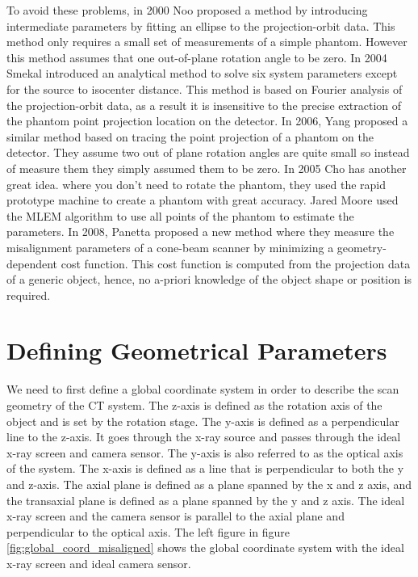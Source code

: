 To avoid these problems, in 2000 Noo \citep{Noo2000} proposed a method by introducing intermediate parameters by fitting an ellipse to the projection-orbit data.  This method only requires a small set of measurements of a simple phantom.  However this method assumes that one out-of-plane rotation angle to be zero.  In 2004 Smekal introduced an analytical method to solve six system parameters except for the source to isocenter distance.  This method is based on Fourier analysis of the projection-orbit data, as a result it is insensitive to the precise extraction of the phantom point projection location on the detector.  In 2006, Yang \citep{Yang2006} proposed a similar method based on tracing the point projection of a phantom on the detector.  They assume two out of plane rotation angles are quite small so instead of measure them they simply assumed them to be zero.  In 2005 Cho has another great idea. \citep{Cho2005} where you don't need to rotate the phantom, they used the rapid prototype machine to create a phantom with great accuracy.  Jared Moore used the MLEM algorithm to use all points of the phantom to estimate the parameters.  In 2008, Panetta \citep{Panetta2008} proposed a new method where they measure the misalignment parameters of a cone-beam scanner by minimizing a geometry-dependent cost function.  This cost function is computed from the projection data of a generic object, hence, no a-priori knowledge of the object shape or position is required.  

\section{Defining Geometrical Parameters}
We need to first define a global coordinate system in order to describe the scan geometry of the CT system.  The z-axis is defined as the rotation axis of the object and is set by the rotation stage.  The y-axis is defined as a perpendicular line to the z-axis.  It goes through the x-ray source and passes through the ideal x-ray screen and camera sensor.  The y-axis is also referred to as the optical axis of the system.  The x-axis is defined as a line that is perpendicular to both the y and z-axis.  The axial plane is defined as a plane spanned by the x and z axis, and the transaxial plane is defined as a plane spanned by the y and z axis.  The ideal x-ray screen and the camera sensor is parallel to the axial plane and perpendicular to the optical axis.  The left figure in figure \ref{fig:global_coord_misaligned} shows the global coordinate system with the ideal x-ray screen and ideal camera sensor.  

